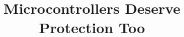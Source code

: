 \documentclass[letterpaper,twocolumn,10pt]{article}
\begin{document}
\date{}

\title{\Large \bf Microcontrollers Deserve Protection Too}


\maketitle


\begin{abstract}

\end{abstract}





%
%
%

{\footnotesize 
}


\theendnotes
\end{document}
